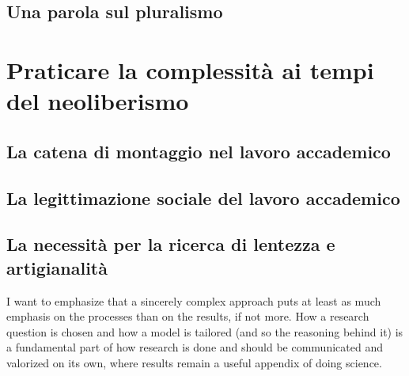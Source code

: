 \documentclass[a4paper, headings=standardclasses]{scrartcl}
\begin{document}
\subsection{Una parola sul pluralismo}

\section{Praticare la complessità ai tempi del neoliberismo}
\subsection{La catena di montaggio nel lavoro accademico}

\subsection{La legittimazione sociale del lavoro accademico}

\subsection{La necessità per la ricerca di lentezza e artigianalità}
I want to emphasize that a sincerely complex approach puts at least as much emphasis on the processes than on the results, if not more. How a research question is chosen and how a model is tailored (and so the reasoning behind it) is a fundamental part of how research is done and should be communicated and valorized on its own, where results remain a useful appendix of doing science.


\printbibliography
\end{document}
